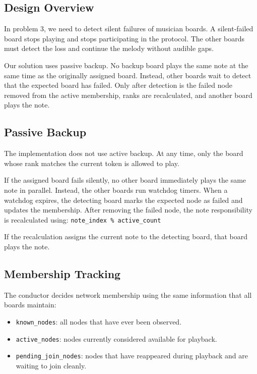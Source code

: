 \documentclass[11pt,a4paper]{article}
\begin{document}
\subsection*{Design Overview}

In problem 3, we need to detect silent failures of musician boards. A silent-failed board stops playing and stops participating in the protocol. The other boards must detect the loss and continue the melody without audible gaps.

Our solution uses passive backup. No backup board plays the same note at the same time as the originally assigned board. Instead, other boards wait to detect that the expected board has failed. Only after detection is the failed node removed from the active membership, ranks are recalculated, and another board plays the note.

\subsection*{Passive Backup}

The implementation does not use active backup. At any time, only the board whose rank matches the current token is allowed to play.

If the assigned board fails silently, no other board immediately plays the same note in parallel. Instead, the other boards run watchdog timers. When a watchdog expires, the detecting board marks the expected node as failed and updates the membership. After removing the failed node, the note responsibility is recalculated using: \texttt{note\_\allowbreak{}index \% active\_\allowbreak{}count}

If the recalculation assigns the current note to the detecting board, that board plays the note.

\subsection*{Membership Tracking}

The conductor decides network membership using the same information that all boards maintain:

\begin{itemize}
  \item \texttt{known\_\allowbreak{}nodes}: all nodes that have ever been observed.
  \item \texttt{active\_\allowbreak{}nodes}: nodes currently considered available for playback.
  \item \texttt{pending\_\allowbreak{}join\_\allowbreak{}nodes}: nodes that have reappeared during playback and are waiting to join cleanly.
\end{itemize}
\end{document}
